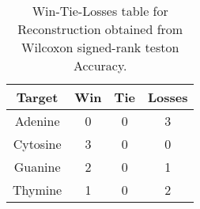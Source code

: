 \begin{table}[H]
\centering
\begin{tabular}{|c|c|c|c|}

\textbf{Target} &  \textbf{Win} &  \textbf{Tie} &  \textbf{Losses} \\
\hline

        Adenine &             0 &             0 &                3 \\
\hline
       Cytosine &             3 &             0 &                0 \\
\hline
        Guanine &             2 &             0 &                1 \\
\hline
        Thymine &             1 &             0 &                2 \\
\hline

\end{tabular}
\caption{Win-Tie-Losses table for Reconstruction obtained from Wilcoxon signed-rank teston Accuracy.}
\label{tab:reconstruction_nucleotides_comparison}
\end{table}
